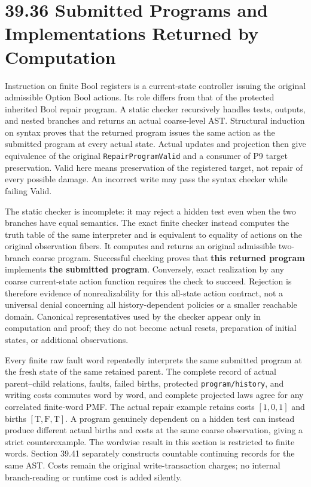 \documentclass[
  english,
  11pt,
  oneside]{book}
\begin{document}
\section{39.36 Submitted Programs and Implementations Returned by Computation}\label{submitted-programs-and-implementations-returned-by-computation}

Instruction on finite Bool registers is a current-state controller issuing the original admissible Option Bool actions. Its role differs from that of the protected inherited Bool repair program. A static checker recursively handles tests, outputs, and nested branches and returns an actual coarse-level AST. Structural induction on syntax proves that the returned program issues the same action as the submitted program at every actual state. Actual updates and projection then give equivalence of the original \nolinkurl{RepairProgramValid} and a consumer of P9 target preservation. Valid here means preservation of the registered target, not repair of every possible damage. An incorrect write may pass the syntax checker while failing Valid.

The static checker is incomplete: it may reject a hidden test even when the two branches have equal semantics. The exact finite checker instead computes the truth table of the same interpreter and is equivalent to equality of actions on the original observation fibers. It computes and returns an original admissible two-branch coarse program. Successful checking proves that \textbf{this returned program} implements \textbf{the submitted program}. Conversely, exact realization by any coarse current-state action function requires the check to succeed. Rejection is therefore evidence of nonrealizability for this all-state action contract, not a universal denial concerning all history-dependent policies or a smaller reachable domain. Canonical representatives used by the checker appear only in computation and proof; they do not become actual resets, preparation of initial states, or additional observations.

Every finite raw fault word repeatedly interprets the same submitted program at the fresh state of the same retained parent. The complete record of actual parent--child relations, faults, failed births, protected \nolinkurl{program/history}, and writing costs commutes word by word, and complete projected laws agree for any correlated finite-word PMF. The actual repair example retains costs \([1,0,1]\) and births \([\mathrm T,\mathrm F,\mathrm T]\). A program genuinely dependent on a hidden test can instead produce different actual births and costs at the same coarse observation, giving a strict counterexample. The wordwise result in this section is restricted to finite words. Section 39.41 separately constructs countable continuing records for the same AST. Costs remain the original write-transaction charges; no internal branch-reading or runtime cost is added silently.
\end{document}

